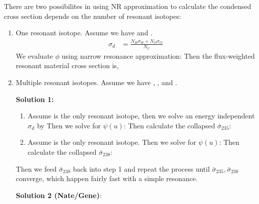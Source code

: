 \documentclass{school-22.211-notes}
\begin{document}
There are two possibilites in using NR approximation to calculate the condensed cross section depends on the number of resonant isotopes: 
\begin{enumerate}
\item One resonant isotope. Assume we have  and . 
\begin{align}
\sigma_d &= \frac{N_H \sigma_H + N_O \sigma_O}{N_U} 
\end{align}
We evaluate $\phi$ using narrow resonance approximation: 
Then the flux-weighted resonant material cross section is,

\item Multiple resonant isotopes. Assume we have , , and . 

  \textbf{Solution 1:}
  \begin{enumerate}
  \item Assume  is the only resonant isotope, then we solve an energy independent $\sigma_d$ by 
    Then we solve for $\psi(u)$:
    Then calculate the collapsed $\bar{\sigma}_{235}$:
  \item Assume  is the only resonant isotope. 
    Then we solve for $\psi(u)$:
    Then calculate the collapsed $\bar{\sigma}_{238}$:
  \end{enumerate}
  Then we feed $\bar{\sigma}_{238}$ back into step 1 and repeat the process until $\bar{\sigma}_{235}, \bar{\sigma}_{238}$ converge, which happen fairly fast with a simple resonance. 


\textbf{Solution 2 (Nate/Gene)}: 


\end{enumerate}
\end{document}
